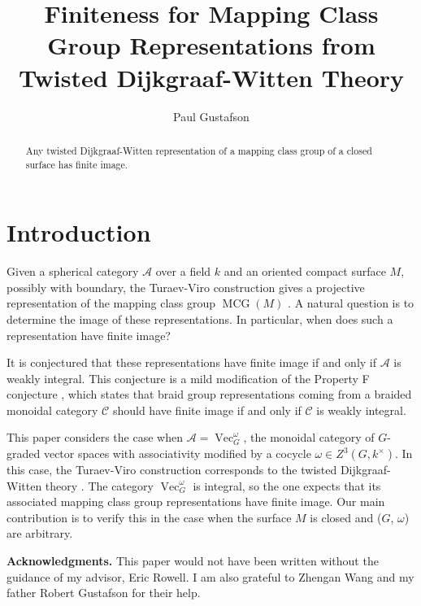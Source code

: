 \documentclass{amsart}
\DeclareMathOperator{\MCG}{MCG}
\DeclareMathOperator{\Vect}{Vec}
\begin{document}
\title{Finiteness for Mapping Class Group Representations from Twisted Dijkgraaf-Witten Theory}


\author{Paul Gustafson}
\address{Department of Mathematics,
    Texas A\&M University,
    College Station, TX
    U.S.A.}
    

\begin{abstract}
Any twisted Dijkgraaf-Witten representation of a mapping class group of a closed surface has finite image.
\end{abstract}

\maketitle

\section{Introduction}
Given a spherical category $\mathcal A$ over a field $k$ and an oriented compact surface $M$, possibly with boundary, the Turaev-Viro construction gives a projective representation of the mapping class group $\MCG(M)$ \cite{TURAEV1992865, hep-th/9311155}.  A natural question is to determine the image of these representations.  In particular,  when does such a representation have finite image?

It is conjectured that these representations have finite image if and only if  $\mathcal A$ is weakly integral.  This conjecture is a mild modification of the Property F conjecture \cite{nr, erw}, which states that braid group representations coming from a braided monoidal category $\mathcal C$ should have finite image if and only if $\mathcal C$ is weakly integral. 

This paper considers the case when $\mathcal A = \Vect_G^\omega$, the monoidal category of $G$-graded vector spaces with associativity modified by a cocycle $\omega \in Z^3(G, k^\times)$.  In this case, the Turaev-Viro construction corresponds to the twisted Dijkgraaf-Witten theory \cite{dijkgraaf1990}.  The category $\Vect_G^\omega$ is integral, so the one expects that its associated mapping class group representations have finite image.  Our main contribution is to verify this in the case  when the surface $M$ is closed and ($G$, $\omega$) are arbitrary.  

\textbf{Acknowledgments.}  This paper would not have been written without the guidance of my advisor, Eric Rowell.  I am also grateful to Zhengan Wang and my father Robert Gustafson for their help.
\end{document}
